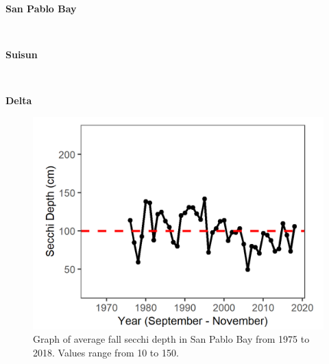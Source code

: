 \documentclass[
]{book}
\begin{document}
\begin{panel-grid}

\begin{columns-nocenter}

\begin{column800}

\textbf{San Pablo Bay}

\end{column800}

\begin{column40}

~

\end{column40}

\begin{column800}

\textbf{Suisun}

\end{column800}

\begin{column40}

~

\end{column40}

\begin{column800}

\textbf{Delta}

\end{column800}

\end{columns-nocenter}

\begin{columns-nocenter}

\begin{column800}

\begin{expand}

\begin{figure}
\includegraphics[width=15.25in]{figures/secchi_splfall} \caption{Graph of average fall secchi depth in San Pablo Bay from 1975 to 2018. Values range from 10 to 150.}\label{fig:unnamed-chunk-96}
\end{figure}


\end{expand}
\end{column800}
\end{columns-nocenter}
\end{panel-grid}
\end{document}

